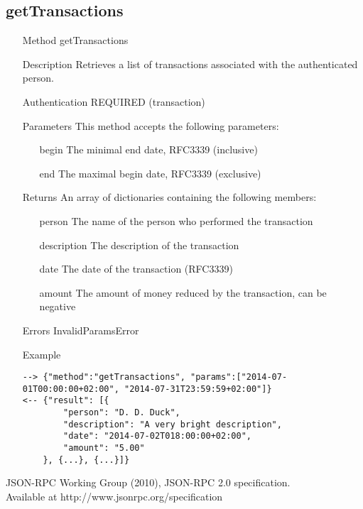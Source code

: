 \documentclass[a4paper]{scrreprt}
\begin{document}
\subsection{getTransactions}
\begin{enumerate}
\item[Method] getTransactions
\item[Description] Retrieves a list of transactions associated with the authenticated person.
\item[Authentication] REQUIRED (transaction)
\item[Parameters] This method accepts the following parameters:
\begin{enumerate}
	\item[begin] The minimal end date, RFC3339 (inclusive)
    \item[end] The maximal begin date, RFC3339 (exclusive)
    \end{enumerate}
\item[Returns] An array of dictionaries containing the following members:
\begin{enumerate}
    \item[person] The name of the person who performed the transaction
    \item[description] The description of the transaction
    \item[date] The date of the transaction (RFC3339)
    \item[amount] The amount of money reduced by the transaction, can be negative
	\end{enumerate}
\item[Errors] InvalidParamsError
\item[Example]
\begin{lstlisting}
--> {"method":"getTransactions", "params":["2014-07-01T00:00:00+02:00", "2014-07-31T23:59:59+02:00"]}
<-- {"result": [{
        "person": "D. D. Duck",
        "description": "A very bright description",
        "date": "2014-07-02T018:00:00+02:00",
        "amount": "5.00"
    }, {...}, {...}]}
\end{lstlisting}
\end{enumerate}


\begin{thebibliography}{9}

	JSON-RPC Working Group (2010), JSON-RPC 2.0 specification.\\ Available at http://www.jsonrpc.org/specification

\end{thebibliography}
\end{document}
